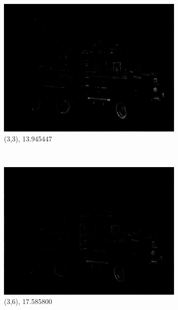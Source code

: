 \documentclass[11pt,a4paper,titlepage]{article}
\begin{document}
\begin{figure}
\begin{subfigure}[t]{0.31\textwidth}
		\includegraphics[width=\textwidth]{results/tiles_legotruck_6x6x480x640_480x640x5_tiling_4x6x200x200_overlap_0.5/MSE_for_view_(3,3).png}
		\caption{(3,3), 13.945447}
	\end{subfigure}%
	~
	\begin{subfigure}[t]{0.31\textwidth}
		\includegraphics[width=\textwidth]{results/tiles_legotruck_6x6x480x640_480x640x5_tiling_4x6x200x200_overlap_0.5/MSE_for_view_(3,6).png}
		\caption{(3,6), 17.585800}
	\end{subfigure}%
	\\
	\begin{subfigure}[t]{0.31\textwidth}

\end{subfigure}
\end{figure}
\end{document}
